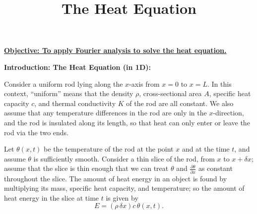\documentclass{article}
\begin{document}
\title{The Heat Equation}
\date{}

\maketitle
\thispagestyle{empty}

\Large

\vskip -10mm

\textbf{\underline{Objective: To apply Fourier analysis to solve the heat equation.}}







\vspace{5mm}












\textbf{Introduction: The Heat Equation (in 1D):}

\bigskip


Consider a uniform rod lying along the $x$-axis from $x=0$ to $x=L$. In this context, ``uniform'' means that the density $\rho$, cross-sectional area $A$, specific heat capacity $c$, and thermal conductivity $K$ of the rod are all constant. We also assume that any temperature differences in the rod are only in the $x$-direction, and the rod is insulated along its length, so that heat can only enter or leave the rod via the two ends.

Let $\theta(x,t)$ be the temperature of the rod at the point $x$ and at the time $t$, and assume $\theta$ is sufficiently smooth. Consider a thin slice of the rod, from $x$ to $x+\delta x$; assume that the slice is thin enough that we can treat $\theta$ and $\frac{\partial \theta}{\partial x}$ as constant throughout the slice. The amount of heat energy in an object is found by multiplying its mass, specific heat capacity, and temperature; so the amount of heat energy in the slice at time $t$ is given by
\[E=(\rho \,\delta x)c \,\theta(x,t).\]
\end{document}
